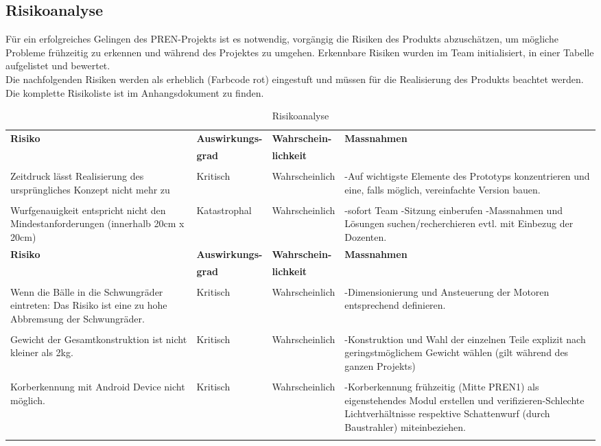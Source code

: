 \subsection{Risikoanalyse}
Für ein erfolgreiches Gelingen des PREN-Projekts ist es notwendig, vorgängig die Risiken des Produkts abzuschätzen, 
um mögliche Probleme frühzeitig zu erkennen und während des Projektes zu umgehen. Erkennbare Risiken wurden im Team 
initialisiert, in einer Tabelle aufgelistet und bewertet. \\
Die nachfolgenden Risiken werden als erheblich (Farbcode rot) eingestuft und müssen für die Realisierung des Produkts beachtet werden. 
Die komplette Risikoliste ist im Anhangsdokument zu finden.

 \begin{longtable}{p{4cm}l l p{5.5cm}}
 	\textbf{Risiko} & \textbf{Auswirkungs-} & \textbf{Wahrschein-} & \textbf{Massnahmen} \\
 	                & \textbf{grad}         & \textbf{lichkeit}    & \\
 	     
 	\hline     &       &                              &             \\
	Zeitdruck lässt Realisierung des ursprüngliches Konzept nicht mehr zu &  Kritisch & Wahrscheinlich & -Auf wichtigste Elemente des Prototyps konzentrieren und eine, falls möglich, vereinfachte Version bauen. \\
	&&&\\
	Wurfgenauigkeit entspricht nicht den Mindestanforderungen (innerhalb 20cm x 20cm) & Katastrophal & Wahrscheinlich &  -sofort Team -Sitzung einberufen  -Massnahmen und Lösungen suchen/recherchieren evtl. mit Einbezug der Dozenten.\\
    \newpage
    \textbf{Risiko} & \textbf{Auswirkungs-} & \textbf{Wahrschein-} & \textbf{Massnahmen} \\
				    & \textbf{grad}         & \textbf{lichkeit}    & \\	
    \hline     &       &     &             \\ 
	Wenn die Bälle in die Schwungräder eintreten: Das Risiko ist eine zu hohe Abbremsung der Schwungräder. & Kritisch & Wahrscheinlich & -Dimensionierung und Ansteuerung der Motoren entsprechend definieren.\\
    &&&\\                 
	Gewicht der Gesamtkonstruktion ist nicht kleiner als 2kg. & Kritisch & Wahrscheinlich & -Konstruktion und Wahl der einzelnen Teile explizit nach geringstmöglichem Gewicht wählen (gilt während des ganzen Projekts)\\
	&&&\\
	Korberkennung mit Android Device nicht möglich. & Kritisch & Wahrscheinlich & -Korberkennung frühzeitig (Mitte PREN1) als eigenstehendes Modul erstellen und verifizieren-Schlechte Lichtverhältnisse respektive Schattenwurf (durch Baustrahler) miteinbeziehen.\\
	
	 
 	
 	\caption{Risikoanalyse}
 	\label{tab:RikisoanalyseTabelle}
 \end{longtable}

